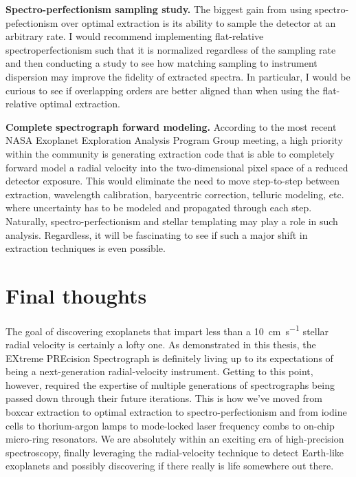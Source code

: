 \textbf{Spectro-perfectionism sampling study.} The biggest gain from using spectro-pefectionism over optimal extraction is its ability to sample the detector at an arbitrary rate. I would recommend implementing flat-relative spectroperfectionism such that it is normalized regardless of the sampling rate and then conducting a study to see how matching sampling to instrument dispersion may improve the fidelity of extracted spectra. In particular, I would be curious to see if overlapping orders are better aligned than when using the flat-relative optimal extraction.

\textbf{Complete spectrograph forward modeling.} According to the most recent NASA Exoplanet Exploration Analysis Program Group meeting, a high priority within the community is generating extraction code that is able to completely forward model a radial velocity into the two-dimensional pixel space of a reduced detector exposure. This would eliminate the need to move step-to-step between extraction, wavelength calibration, barycentric correction, telluric modeling, etc. where uncertainty has to be modeled and propagated through each step. Naturally, spectro-perfectionism and stellar templating may play a role in such analysis. Regardless, it will be fascinating to see if such a major shift in extraction techniques is even possible.

\section{Final thoughts} \label{conclusion:final}

The goal of discovering exoplanets that impart less than a 10~\si{\centi\meter\per\second} stellar radial velocity is certainly a lofty one. As demonstrated in this thesis, the EXtreme PREcision Spectrograph is definitely living up to its expectations of being a next-generation radial-velocity instrument. Getting to this point, however, required the expertise of multiple generations of spectrographs being passed down through their future iterations. This is how we've moved from boxcar extraction to optimal extraction to spectro-perfectionism and from iodine cells to thorium-argon lamps to mode-locked laser frequency combs to on-chip micro-ring resonators. We are absolutely within an exciting era of high-precision spectroscopy, finally leveraging the radial-velocity technique to detect Earth-like exoplanets and possibly discovering if there really is life somewhere out there.